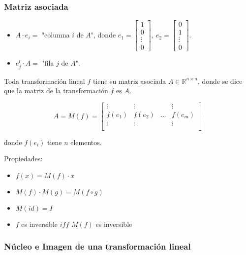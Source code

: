 \subsubsection{Matriz asociada}
\label{subsubsec:matriz_asociada}

\begin{itemize}
    \item $A\cdot e_i =$ "columna $i$ de $A$", donde $e_1 = 
    \begin{bmatrix}
    1 \\
    0 \\
    \vdots \\
    0
    \end{bmatrix},~ e_2 = 
    \begin{bmatrix}
    0 \\
    1 \\
    \vdots \\
    0
    \end{bmatrix}$.
    \item $e_{j}^{t}\cdot A =$ "fila $j$ de $A$".
\end{itemize}

\noindent Toda transformación lineal $f$ tiene su matriz asociada $A \in \mathbb{R}^{n \times n}$, donde se dice que la matriz de la transformación $f$ es $A$.

\[
A = M(f) = 
\begin{bmatrix}
\vdots & \vdots &  & \vdots \\
f(e_1) & f(e_2) & \ldots & f(e_m) \\
\vdots & \vdots &  & \vdots \\
\end{bmatrix}
\]

donde $f(e_i)$ tiene $n$ elementos.

\noindent Propiedades:

\begin{itemize}
    \item $f(x) = M(f)\cdot x$
    \item $M(f)\cdot M(g) = M(f \circ g)$
    \item $M(id) = I$
    \item $f$ es inversible $iff$ $M(f)$ es inversible
\end{itemize}

\subsubsection{Núcleo e Imagen de una transformación lineal}
\label{subsubsec:nucleo_e_imagen_de_tl}

